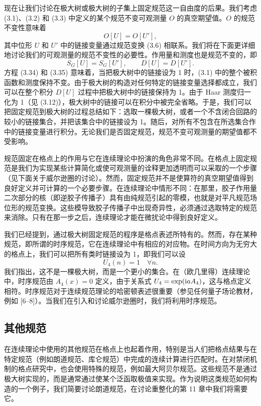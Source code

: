现在让我们讨论在极大树或极大树的子集上固定规范这一自由度的后果。我们考虑 (3.1)、(3.2) 和 (3.3) 中定义的某个规范不变可观测量 $O$ 的真空期望值。$O$ 的规范不变性意味着
\begin{equation}
  O[U] = O[U'] ,
\end{equation}
其中位形 $U$ 和 $U'$ 中的链接变量通过规范变换 (3.6) 相联系。我们将在下面更详细地讨论我们的可观测量的规范不变性的必要性。作用量和测度也是规范不变的，即
\begin{equation}
  S_G[U] = S_G[U'] , \qquad D[U] = D[U'] .
\end{equation}
方程 (3.34) 和 (3.35) 意味着，当把极大树中的链接设为 1 时，(3.1) 中的整个被积函数和测度保持不变。由于极大树的构造对任何特定的链接变量选择都成立，我们可以在整个积分 $D[U]$ 过程中把极大树中的链接保持为 1。由于 Haar 测度归一化为 1（见 (3.12)），极大树中的链接可以在积分中被完全省略。于是，我们可以把固定规范到极大树的过程总结如下：选取一棵极大树，或者一个不含闭合回路的较小的链接集合，并把该集合中的链接设为 1。随后，对所有不包含在所选集合作中的链接变量进行积分。无论我们是否固定规范，规范不变可观测量的期望值都不受影响。

规范固定在格点上的作用与它在连续理论中扮演的角色非常不同。在格点上固定规范是我们为实现某些计算简化或使可观测量的诠释更加透明而可以采取的一个步骤（见下面关于威尔逊圈的讨论）。然而，固定规范并不是使算符的真空期望值得到良好定义并可计算的一个必要步骤。在连续理论中情形不同：在那里，胶子作用量二次部分的核（即逆胶子传播子）具有由纯规范引起的零模，也就是对平凡规范场位形的规范变换。这些模导致胶子传播子中出现奇异性，必须通过选取特定的规范来消除。只有在那一步之后，连续理论才能在微扰论中得到良好定义。

我们已经提到，通过极大树固定规范的程序是格点表述所特有的。然而，存在某种规范，即所谓的时序规范，它在连续理论中有相应的对应物。在时间方向为无穷大的格点上，我们可以把所有类时链接设为 1，即我们可以设
\begin{equation}
  U_4(n) = 1 \quad \forall n .
\end{equation}
我们指出，这不是一棵极大树，而是一个更小的集合。在（欧几里得）连续理论中，时序规范由 $A_4(x) = 0$ 定义，由于关系式 $U_4 = \exp(\mathrm{i} a A_4)$，这与格点定义相符。时序规范对于连续规范理论的哈密顿表述很重要（参见任何量子场论教材，例如 [6--8]）。当我们在引入和讨论威尔逊圈时，我们将利用时序规范。

\subsection{其他规范}

在连续理论中使用的其他规范在格点上也起着作用，特别是当人们把格点结果与在特定规范（例如朗道规范、库仑规范）中完成的连续计算进行匹配时。在对禁闭机制的格点研究中，也会使用特殊的规范，例如最大阿贝尔规范。这些规范不是通过极大树实现的，而是通常通过使某个泛函取极值来实现。作为说明这类规范如何构造的一个例子，我们简要讨论朗道规范，在讨论重整化的第 11 章中我们将需要它。

